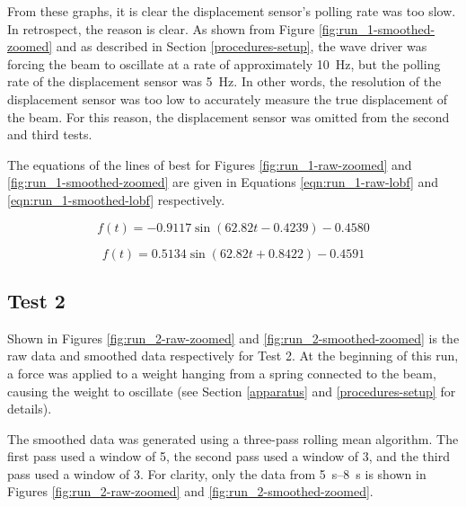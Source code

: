 \documentclass[12 pt]{report}
\begin{document}
From these graphs, it is clear the displacement sensor's polling rate was too slow. In retrospect, the reason is clear. As shown from Figure \ref{fig:run_1-smoothed-zoomed} and as described in Section \ref{procedures-setup}, the wave driver was forcing the beam to oscillate at a rate of approximately \qty{10}{\hertz}, but the polling rate of the displacement sensor was \qty{5}{\hertz}. In other words, the resolution of the displacement sensor was too low to accurately measure the true displacement of the beam. For this reason, the displacement sensor was omitted from the second and third tests.

The equations of the lines of best for Figures \ref{fig:run_1-raw-zoomed} and \ref{fig:run_1-smoothed-zoomed} are given in Equations \ref{eqn:run_1-raw-lobf} and \ref{eqn:run_1-smoothed-lobf} respectively.

\begin{equation} \label{eqn:run_1-raw-lobf}
f(t)=-0.9117\sin(62.82t-0.4239)-0.4580
\end{equation}

\begin{equation} \label{eqn:run_1-smoothed-lobf}
f(t)=0.5134\sin(62.82t+0.8422)-0.4591
\end{equation}

\subsection{Test 2} \label{data-test_2}
Shown in Figures \ref{fig:run_2-raw-zoomed} and \ref{fig:run_2-smoothed-zoomed} is the raw data and smoothed data respectively for Test \num{2}. At the beginning of this run, a force was applied to a weight hanging from a spring connected to the beam, causing the weight to oscillate (see Section \ref{apparatus} and \ref{procedures-setup} for details).

The smoothed data was generated using a three-pass rolling mean algorithm. The first pass used a window of \num{5}, the second pass used a window of \num{3}, and the third pass used a window of \num{3}. For clarity, only the data from \qtyrange{5}{8}{\s} is shown in Figures \ref{fig:run_2-raw-zoomed} and \ref{fig:run_2-smoothed-zoomed}.
\end{document}
